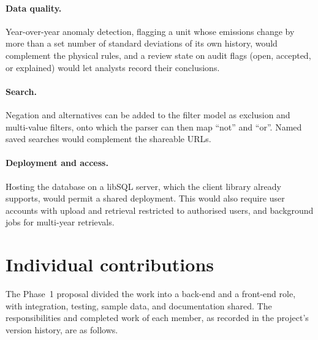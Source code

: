 \documentclass[11pt,a4paper]{article}
\begin{document}
\paragraph{Data quality.} Year-over-year anomaly detection, flagging a unit whose emissions
change by more than a set number of standard deviations of its own history, would complement
the physical rules, and a review state on audit flags (open, accepted, or explained) would let
analysts record their conclusions.

\paragraph{Search.} Negation and alternatives can be added to the filter model as exclusion and
multi-value filters, onto which the parser can then map ``not'' and ``or''. Named saved searches
would complement the shareable URLs.

\paragraph{Deployment and access.} Hosting the database on a libSQL server, which the client
library already supports, would permit a shared deployment. This would also require user
accounts with upload and retrieval restricted to authorised users, and background jobs for
multi-year retrievals.

\section{Individual contributions}
\label{sec:contributions}

The Phase~1 proposal divided the work into a back-end and a front-end role, with integration,
testing, sample data, and documentation shared. The responsibilities and completed work of each
member, as recorded in the project's version history, are as follows.
\end{document}
